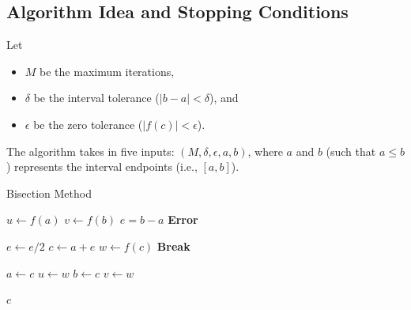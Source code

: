 \documentclass[letterpaper]{article}
\begin{document}
\subsection{Algorithm Idea and Stopping Conditions}
Let 
\begin{itemize}
    \item $M$ be the maximum iterations, 
    \item $\delta$ be the interval tolerance ($|b - a| < \delta$), and 
    \item $\epsilon$ be the zero tolerance ($|f(c)| < \epsilon$).
\end{itemize}
The algorithm takes in five inputs: $(M, \delta, \epsilon, a, b)$, where $a$ and $b$ (such that $a \leq b$) represents the interval endpoints (i.e., $[a, b]$).

\begin{algorithm}[H]
    \caption{Bisection Method}
    \label{alg:two}
    \begin{algorithmic}[1]
            \State $u \gets f(a)$
            \State $v \gets f(b)$
            \State $e = b - a$
            \State \textbf{Error}
            \EndIf 

                \State $e \gets e / 2$
                \State $c \gets a + e$
                \State $w \gets f(c)$
                    \State \textbf{Break}
                \EndIf 

                    \State $a \gets c$
                    \State $u \gets w$
                \Else 
                    \State $b \gets c$
                    \State $v \gets w$
                \EndIf 
            \EndFor 

            \State \Return $c$
        \EndFunction
    \end{algorithmic}
\end{algorithm}
\end{document}
